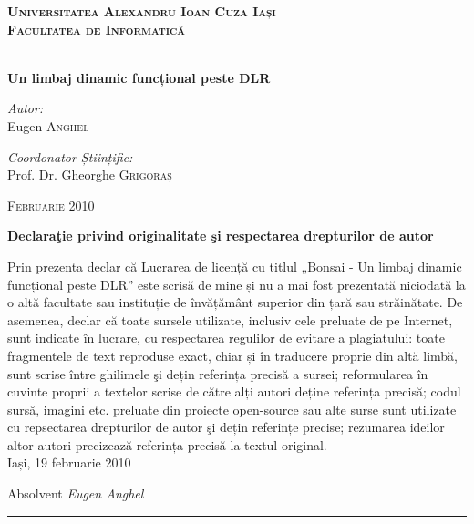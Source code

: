 \documentclass[12pt,a4paper]{memoir}
\begin{document}
\thispagestyle{empty}
\vspace*{-4cm}
\begin{centering}
\textbf{\textsc{\Large{Universitatea Alexandru Ioan Cuza Iași\\Facultatea de Informatică}}}

\vspace{7cm}

\textbf{\\[0.5cm]
\LARGE{Un limbaj dinamic funcțional peste DLR}}
\\[3cm]

\flushleft
\begin{minipage}{0.4\linewidth}
\centering
\large
\emph{Autor:}\\
Eugen \textsc{Anghel}
\end{minipage}
\hspace{0.5cm}
\flushright
\vspace{-1.5cm}
\begin{minipage}{0.5\linewidth}
\centering
\large
\emph{Coordonator Științific:} \\
Prof. Dr. Gheorghe \textsc{Grigoraș}
\end{minipage}
\vfill
\centering\large{\textsc{Februarie 2010}}\\
\end{centering}
\cleardoublepage
\thispagestyle{empty}
\begin{centering}
\LARGE{\textbf{Declaraţie privind originalitate şi respectarea drepturilor de autor}}
\end{centering}

\vspace{2cm}

Prin prezenta declar că Lucrarea de licență cu titlul „Bonsai - Un limbaj dinamic funcțional peste DLR” este scrisă de mine și nu a mai fost prezentată niciodată la o altă facultate sau instituție de învățământ superior din țară sau străinătate. De asemenea, declar că toate sursele utilizate, inclusiv cele preluate de pe Internet, sunt indicate în lucrare, cu respectarea regulilor de evitare a plagiatului: toate fragmentele de text reproduse exact, chiar și în traducere proprie din altă limbă, sunt scrise între ghilimele şi dețin referința precisă a sursei; reformularea în cuvinte proprii a textelor scrise de către alți autori deține referința precisă; codul sursă, imagini etc. preluate din proiecte open-source sau alte surse sunt utilizate cu repsectarea drepturilor de autor şi dețin referințe precise; rezumarea ideilor altor autori precizează referința precisă la textul original.
\\[2cm]
Iași, 19 februarie 2010
\\[1cm]
\begin{flushright}
Absolvent \emph{Eugen Anghel}\\[1.4cm]
\rule{0.31\linewidth}{0.2mm}
\end{flushright}
\end{document}
